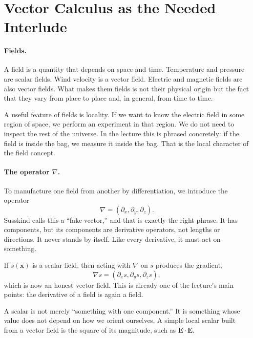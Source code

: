\section{Vector Calculus as the Needed Interlude}

\paragraph{Fields.}
A field is a quantity that depends on space and time. Temperature and pressure are scalar fields. Wind velocity is a vector field. Electric and magnetic fields are also vector fields. What makes them fields is not their physical origin but the fact that they vary from place to place and, in general, from time to time.

A useful feature of fields is locality. If we want to know the electric field in some region of space, we perform an experiment in that region. We do not need to inspect the rest of the universe. In the lecture this is phrased concretely: if the field is inside the bag, we measure it inside the bag. That is the local character of the field concept.

\paragraph{The operator \(\nabla\).}
To manufacture one field from another by differentiation, we introduce the operator
\begin{equation}
\nabla=(\partial_x,\partial_y,\partial_z).
\end{equation}
Susskind calls this a ``fake vector,'' and that is exactly the right phrase. It has components, but its components are derivative operators, not lengths or directions. It never stands by itself. Like every derivative, it must act on something.

If \(s(\mathbf x)\) is a scalar field, then acting with \(\nabla\) on \(s\) produces the gradient,
\begin{equation}
\nabla s=(\partial_x s,\partial_y s,\partial_z s),
\end{equation}
which is now an honest vector field. This is already one of the lecture's main points: the derivative of a field is again a field.

A scalar is not merely ``something with one component.'' It is something whose value does not depend on how we orient ourselves. A simple local scalar built from a vector field is the square of its magnitude, such as \(\mathbf E\cdot \mathbf E\).


